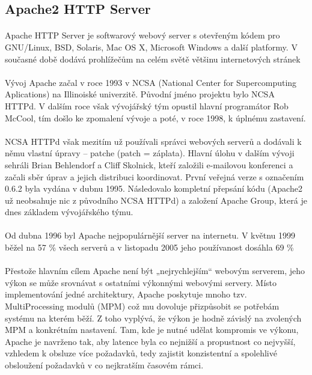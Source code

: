 \subsection{Apache2 HTTP Server}
\paragraph{}
Apache HTTP Server je softwarový webový server s otevřeným kódem pro GNU/Linux, BSD, Solaris, Mac OS X, Microsoft Windows a další platformy. V současné době dodává prohlížečům na celém světě většinu internetových stránek
\paragraph{}
Vývoj Apache začal v roce 1993 v NCSA (National Center for Supercomputing Aplications) na Illinoiské univerzitě. Původní jméno projektu bylo NCSA HTTPd. V dalším roce však vývojářský tým opustil hlavní programátor Rob McCool, tím došlo ke zpomalení vývoje a poté, v roce 1998, k úplnému zastavení.
\paragraph{}
NCSA HTTPd však mezitím už používali správci webových serverů a dodávali k němu vlastní úpravy – patche (patch = záplata). Hlavní úlohu v dalším vývoji sehráli Brian Behlendorf a Cliff Skolnick, kteří založili e-mailovou konferenci a začali sběr úprav a jejich distribuci koordinovat. První veřejná verze s označením 0.6.2 byla vydána v dubnu 1995. Následovalo kompletní přepsání kódu (Apache2 už neobsahuje nic z původního NCSA HTTPd) a založení Apache Group, která je dnes základem vývojářského týmu.
\paragraph{}
Od dubna 1996 byl Apache nejpopulárnější server na internetu. V květnu 1999 běžel na 57 \% všech serverů a v listopadu 2005 jeho používanost dosáhla 69 \%
\paragraph{}
Přestože hlavním cílem Apache není být „nejrychlejším“ webovým serverem, jeho výkon se může srovnávat s ostatními výkonnými webovými servery. Místo implementování jedné architektury, Apache poskytuje mnoho tzv. MultiProcessing modulů (MPM) což mu dovoluje přizpůsobit se potřebám systému na kterém běží. Z toho vyplývá, že výkon je hodně závislý na zvolených MPM a konkrétním nastavení. Tam, kde je nutné udělat kompromis ve výkonu, Apache je navrženo tak, aby latence byla co nejnižší a propustnost co nejvyšší, vzhledem k obsluze více požadavků, tedy zajistit konzistentní a spolehlivé obsloužení požadavků v co nejkratším časovém rámci.